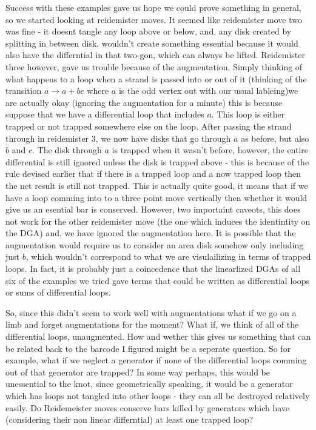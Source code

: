 \documentclass[11pt,oneside]{amsart}
\begin{document}
Success with these examples gave us hope we could prove something in general, so we started looking at reidemister moves. It seemed like reidemister move two was fine - it doesnt tangle any loop above or below, and, any disk created by splitting in between disk, wouldn't create something essential because it would also have the differntial in that two-gon, which can always be lifted. Reidemister three however, gave us trouble because of the augmentation. Simply thinking of what happens to a loop when a strand is passed  into or out of it (thinking of the transition $a \rightarrow a + bc$ where $a$ is the odd vertex out with our usual lableing)we are actually okay (ignoring the augmentation for a minute) this is because suppose that we have a differential loop that includes $a$. This loop is either trapped or not trapped somewhere else on the loop. After passing the strand through in reidemister 3, we now have disks that go through $a$ as before, but also $b$ and $c$. The disk through $a$ is trapped when it wasn't before, however, the entire differential is still ignored unless the disk is trapped above - this is because of the rule devised earlier that if there is a trapped loop and a now trapped loop then the net result is still not trapped. This is actually quite good, it means that if we have a loop comming into to a three point move vertically then whether it would give us an esential bar is conserved. However, two importaint caveots, this does not work for the other reidemister move (the one which induces the identintity on the DGA) and, we have ignored the augmentation here. It is possible that the augmentation would require us to consider an area disk somehow only including just $b$, which wouldn't correspond to what we are visulailizing in terms of trapped loops. In fact, it is probably just a coincedence that the linearlized DGAs of all six of the examples we tried gave terms that could be written as differential loops or sums of differential loops. 


So, since this didn't seem to work well with augmentations what if we go on a limb and forget augmentations for the moment? What if, we think of all of the differential loops, unaugmented. How and wether this gives us something that can be related back to the barcode I figured might be a seperate question. So for example, what if we neglect a generator if none of the differential loops comming out of that generator are trapped? In some way perhaps, this would be unessential to the knot, since geometrically speaking, it would be a generator which has loops not tangled into other loops - they can all be destroyed relatively easily. Do Reidemeister moves conserve bars killed by generators which have (considering their non linear differntial) at least one trapped loop?
\end{document}
